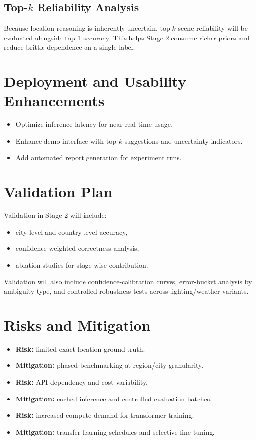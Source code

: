 \subsection{Top-$k$ Reliability Analysis}
Because location reasoning is inherently uncertain, top-$k$ scene reliability will be evaluated alongside top-1 accuracy. This helps Stage 2 consume richer priors and reduce brittle dependence on a single label.

\section{Deployment and Usability Enhancements}
\begin{itemize}
\item Optimize inference latency for near real-time usage.
\item Enhance demo interface with top-$k$ suggestions and uncertainty indicators.
\item Add automated report generation for experiment runs.
\end{itemize}

\section{Validation Plan}
Validation in Stage 2 will include:
\begin{itemize}
\item city-level and country-level accuracy,
\item confidence-weighted correctness analysis,
\item ablation studies for stage wise contribution.
\end{itemize}

Validation will also include confidence-calibration curves, error-bucket analysis by ambiguity type, and controlled robustness tests across lighting/weather variants.

\section{Risks and Mitigation}
\begin{itemize}
\item \textbf{Risk:} limited exact-location ground truth.
\item \textbf{Mitigation:} phased benchmarking at region/city granularity.
\item \textbf{Risk:} API dependency and cost variability.
\item \textbf{Mitigation:} cached inference and controlled evaluation batches.
\item \textbf{Risk:} increased compute demand for transformer training.
\item \textbf{Mitigation:} transfer-learning schedules and selective fine-tuning.
\end{itemize}

